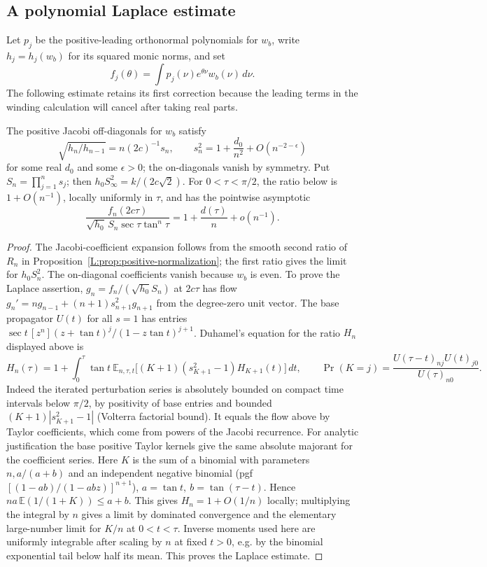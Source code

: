 \subsection{A polynomial Laplace estimate}
Let $p_j$ be the positive-leading orthonormal polynomials for $w_b$, write
$h_j=h_j(w_b)$ for its squared monic norms, and set
\[
 f_j(\theta)=\int p_j(\nu)e^{\theta\nu}w_b(\nu)\,d\nu.
\]
The following estimate retains its first correction because the leading
terms in the winding calculation will cancel after taking real parts.

\begin{lemma}\label{L:lem:polynomial-laplace}
The positive Jacobi off-diagonals for \(w_b\) satisfy
\[
 \sqrt{h_n/h_{n-1}}= n(2c)^{-1} s_n,\qquad s_n^2=1+\frac{d_0}{n^2}+O(n^{-2-\epsilon})
\]
for some real \(d_0\) and some \(\epsilon>0\); the on-diagonals vanish by symmetry. Put \(S_n=\prod_{j=1}^n s_j\); then \(h_0 S_\infty^2=k/(2c\sqrt2)\).
For $0<\tau<\pi/2$, the ratio below is $1+O(n^{-1})$, locally uniformly
in $\tau$, and has the pointwise asymptotic
\begin{equation}\label{L:eq:laplace-correction}
 \frac{f_n(2c\tau)}{\sqrt{h_0}\, S_n \sec\tau\tan^n\tau}
       =1+\frac{d(\tau)}{n}+o(n^{-1}).
\end{equation}
\end{lemma}
\begin{proof}
The Jacobi-coefficient expansion follows from the smooth second ratio of
$R_n$ in Proposition~\ref{L:prop:positive-normalization}; the first ratio
gives the limit for $h_0S_n^2$. The on-diagonal coefficients vanish because
$w_b$ is even. To prove the Laplace assertion, \(g_n=f_n/(\sqrt{h_0} S_n)\) at \(2c\tau\) has flow \(g_n'=n g_{n-1}+(n+1)s_{n+1}^2 g_{n+1}\) from the degree-zero unit vector. The base propagator \(U(t)\) for all \(s=1\) has entries \(\sec t\,[z^n](z+\tan t)^j/(1-z\tan t)^{j+1}\). Duhamel's equation for the ratio \(H_n\) displayed above is
\[
 H_n(\tau)=1+\int_0^\tau \tan t\
  \mathbb E_{n,\tau,t}\big[(K+1)(s_{K+1}^2-1)H_{K+1}(t)\big]\,dt ,
 \qquad
 \Pr(K=j)=\frac{U(\tau-t)_{nj}U(t)_{j0}}{U(\tau)_{n0}}.
\]
Indeed the iterated perturbation series is absolutely bounded on compact time intervals below \(\pi/2\), by positivity of base entries and bounded \((K+1)|s_{K+1}^2-1|\) (Volterra factorial bound). It equals the flow above by Taylor coefficients, which come from powers of the Jacobi recurrence. For analytic justification the base positive Taylor kernels give the same absolute majorant for the coefficient series. Here \(K\) is the sum of a binomial with parameters \(n,a/(a+b)\) and an independent negative binomial (pgf \([(1-ab)/(1-abz)]^{n+1}\)), \(a=\tan t,\ b=\tan(\tau-t)\). Hence \(n a\,\mathbb E(1/(1+K))\le a+b\). This gives \(H_n=1+O(1/n)\) locally; multiplying the integral by \(n\) gives a limit by dominated convergence and the elementary large-number limit for \(K/n\) at \(0<t<\tau\). Inverse moments used here are uniformly integrable after scaling by \(n\) at fixed \(t>0\), e.g. by the binomial exponential tail below half its mean. This proves the Laplace estimate.
\end{proof}

